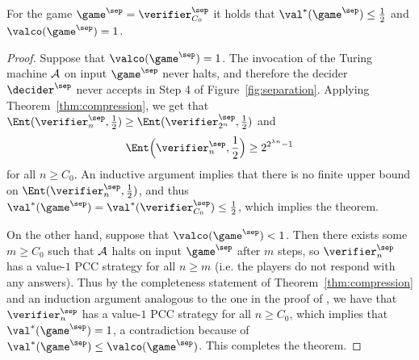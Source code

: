 \begin{theorem}
  \label{thm:separation}
  For the game $\game^\sep = \verifier^\sep_{C_0}$ it holds that
  $\val^*(\game^\sep) \leq \frac{1}{2}$ and $\valco(\game^\sep) = 1$.
\end{theorem}
\begin{proof}
  Suppose that $\valco(\game^\sep) = 1$.
  The invocation of the Turing machine $\cal{A}$ on input $\game^\sep$ never
  halts, and therefore the decider $\decider^\sep$ never accepts in Step 4 of
  Figure~\ref{fig:separation}.
  Applying Theorem~\ref{thm:compression}, we get that
  $\Ent(\verifier^\sep_{n},\frac{1}{2}) \geq
  \Ent(\verifier^\sep_{2^n},\frac{1}{2})$ and
  \begin{equation*}
    \Ent \Bigl( \verifier^\sep_n, \frac{1}{2} \Bigr) \geq 2^{2^{\lambda n}-1}
  \end{equation*}
  for all $n \geq C_0$.
  An inductive argument implies that there is no finite upper bound on
  $\Ent(\verifier^\sep_{n},\frac{1}{2})$, and thus $\val^*(\game^\sep) =
  \val^*(\verifier^\sep_{C_0}) \leq \frac{1}{2}$, which implies the theorem.

  On the other hand, suppose that $\valco(\game^\sep) < 1$.
  Then there exists some $m \geq C_0$ such that $\cal{A}$ halts on input
  $\game^\sep$ after $m$ steps, so $\verifier^\sep_n$ has a value-$1$ PCC
  strategy for all $n \geq m$ (i.e.
  the players do not respond with any answers).
  Thus by the completeness statement of Theorem~\ref{thm:compression} and an
  induction argument analogous to the one in the proof of , we have that $\verifier^\sep_n$ has a value-$1$ PCC
  strategy for all $n \geq C_0$, which implies that $\val^*(\game^\sep) = 1$, a
  contradiction because of $\val^*(\game^\sep) \leq \valco(\game^\sep)$.
  This completes the theorem.
\end{proof}

%
 
\appendix

\newcommand{\ideg}{\mathrm{ideg}}
\newcommand{\Obs}{\mathcal{O}}
\newcommand{\calH}{\mathcal{H}}
\newcommand{\combine}{\mathrm{combine}}
\newcommand{\nqubits}{M}

